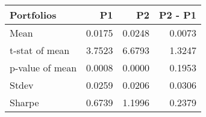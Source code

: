 \begin{tabular}{lrrr}
\toprule
Portfolios & P1 & P2 & P2 - P1 \\
\midrule
Mean & 0.0175 & 0.0248 & 0.0073 \\
t-stat of mean & 3.7523 & 6.6793 & 1.3247 \\
p-value of mean & 0.0008 & 0.0000 & 0.1953 \\
Stdev & 0.0259 & 0.0206 & 0.0306 \\
Sharpe & 0.6739 & 1.1996 & 0.2379 \\
\bottomrule
\end{tabular}

